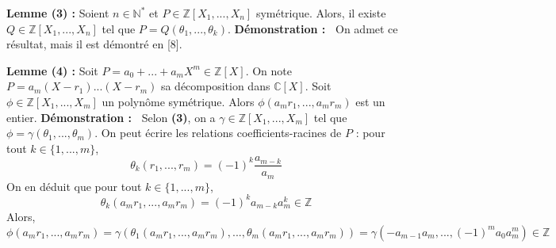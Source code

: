 \documentclass[5pt,a4paper]{article}
\newcommand{\demo}[1]{\textbf{Démonstration :~} #1 \newline}
\begin{document}
\begin{onehalfspacing}
\textbf{Lemme (3) :} Soient $n \in \mathbb{N}^*$ et $P \in \mathbb{Z}[X_1, ..., X_n]$ symétrique. Alors, il existe $Q \in \mathbb{Z}[X_1, ..., X_n]$ tel que $P = Q(\theta_1, ..., \theta_k)$. \newline
\demo{On admet ce résultat, mais il est démontré en [8].}

\textbf{Lemme (4) :} Soit $P = a_0 + ... +a_mX^m \in \mathbb{Z}[X]$. On note $P = a_m(X - r_1)...(X - r_m)$ sa décomposition dans $\mathbb{C}[X]$. Soit $\phi \in \mathbb{Z}[X_1, ..., X_m]$ un polynôme symétrique. Alors $\phi(a_mr_1,...,a_mr_m)$ est un entier. \newline
\demo{Selon \textbf{(3)}, on a $\gamma \in \mathbb{Z}[X_1, ..., X_m]$ tel que $\phi = \gamma(\theta_1, ..., \theta_m)$. On peut écrire les relations coefficients-racines de $P$ : pour tout $k \in \{1, ..., m\}$, 
\[\theta_k(r_1, ..., r_m) = (-1)^k\frac{a_{m-k}}{a_m}\]
On en déduit que pour tout $k \in \{1, ..., m\}$,
\[\theta_k(a_mr_1, ..., a_mr_m) = (-1)^ka_{m-k}a_m^k \in \mathbb{Z}\]
Alors, 
\[\phi(a_mr_1, ..., a_mr_m) = \gamma(\theta_1(a_mr_1, ..., a_mr_m), ..., \theta_m(a_mr_1, ..., a_mr_m)) = \gamma(-a_{m-1}a_m, ..., (-1)^ma_0a_m^m) \in \mathbb{Z}\]
}



\end{onehalfspacing}
\end{document}
